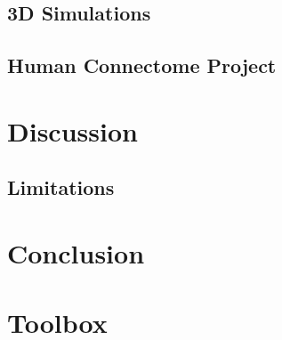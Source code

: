 \subsection{3D Simulations}

\subsection{Human Connectome Project}

\section{Discussion}

\subsection{Limitations}

\section{Conclusion}

\section{Toolbox}